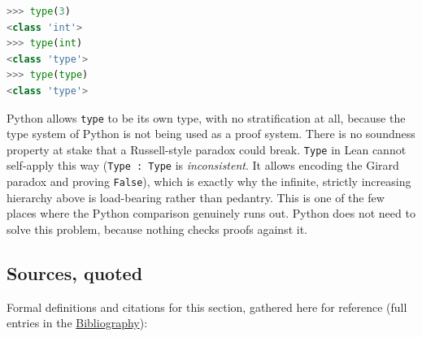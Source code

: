 \begin{lstlisting}[language=Python,style=python]
>>> type(3)
<class 'int'>
>>> type(int)
<class 'type'>
>>> type(type)
<class 'type'>
\end{lstlisting}

Python allows \texttt{type} to be its own type, with no stratification at all, because the type system of Python is not being used as a proof system. There is no soundness property at stake that a Russell-style paradox could break. \texttt{Type} in Lean cannot self-apply this way (\texttt{Type : Type} is \emph{inconsistent}. It allows encoding the Girard paradox and proving \texttt{False}), which is exactly why the infinite, strictly increasing hierarchy above is load-bearing rather than pedantry. This is one of the few places where the Python comparison genuinely runs out. Python does not need to solve this problem, because nothing checks proofs against it.

\subsection{Sources, quoted}\label{sec:06-rigor-check:03-typing-rules-and-safety:7}

Formal definitions and citations for this section, gathered here for reference (full entries in the \hyperref[sec:root:bibliography:1]{Bibliography}):

